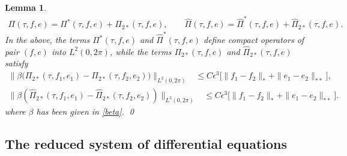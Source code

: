 \documentclass[10pt, reqno]{amsart}
\numberwithin{equation}{section}
\newtheorem{lemma}[theorem]{Lemma}
\theoremstyle{definition}
\begin{document}
{\begin{lemma}
\begin{align*}
 \Pi(\tau, f, e) = \Pi^*(\tau, f, e) + \Pi_{2*}(\tau, f, e), \qquad \hat\Pi(\tau, f, e) = \hat\Pi^*(\tau, f, e) + \hat\Pi_{2*}(\tau, f, e).
\end{align*}
In the above, the terms $\Pi^*(\tau, f, e)$ and $\hat\Pi^*(\tau, f, e)$ define compact operators of pair $(f,e)$ into $L^2(0, 2\pi)$, while the terms $\Pi_{2*}(\tau, f, e) $ and $ \hat\Pi_{2*}(\tau, f, e)$ satisfy
\begin{align*}
\Big\|\beta\Big(\Pi_{2*} (\tau, f_1, e_1) - \Pi_{2*} (\tau, f_2, e_2)\Big)\Big\|_{L^2(0, 2\pi)}
&\leq C \epsilon^{3} \big[\|f_1- f_2\|_*+ \|e_1- e_2\|_{**}\big],
\end{align*}
\begin{align*}
\Big\|\beta\left(\hat\Pi_{2*} (\tau, f_1, e_1) - \hat\Pi_{2*} (\tau, f_2, e_2) \right)\|_{L^2(0, 2\pi)}
&
\leq C \epsilon^{3} \big[\|f_1- f_2\|_*+ \|e_1- e_2\|_{**}\big].
\end{align*}
where $\beta$ has been given in \eqref{beta}.
\qed
\end{lemma}




\medskip
\subsection{ The reduced system of differential equations}\label{Section7.3}\

}
\end{document}
